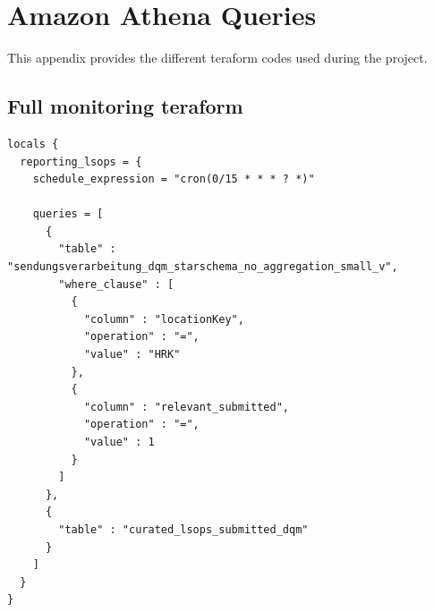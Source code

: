 \chapter{Amazon Athena Queries}

This appendix provides the different teraform codes used during the project.

\section{Full monitoring teraform}
\label{FullTestingTeraformMonitoringCode}
\begin{lstlisting}[caption={Excerpt of the Terraform configuration defining scheduled data quality monitoring queries},label={lst:terraform_dqm}]
locals {
  reporting_lsops = {
    schedule_expression = "cron(0/15 * * * ? *)"

    queries = [
      {
        "table" : "sendungsverarbeitung_dqm_starschema_no_aggregation_small_v",
        "where_clause" : [
          {
            "column" : "locationKey",
            "operation" : "=",
            "value" : "HRK"
          },
          {
            "column" : "relevant_submitted",
            "operation" : "=",
            "value" : 1
          }
        ]
      },
      {
        "table" : "curated_lsops_submitted_dqm"
      }
    ]
  }
}
\end{lstlisting}